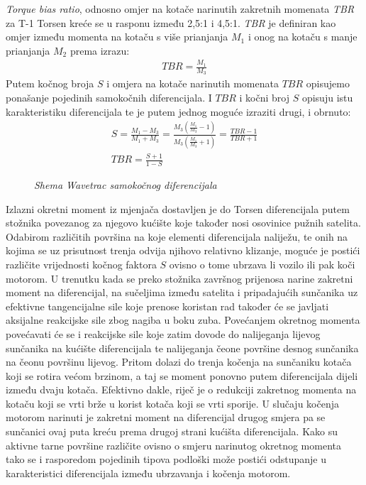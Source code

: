 \documentclass[11pt]{article}
\numberwithin{equation}{section}%
\begin{document}
\textit{Torque bias ratio}, odnosno omjer na kotače narinutih zakretnih momenata \textit{TBR} za T-1 Torsen kreće se u rasponu između 2,5:1 i 4,5:1. \textit{TBR} je definiran kao omjer između momenta na kotaču s više prianjanja $M_1$ i onog na kotaču s manje prianjanja $M_2$ prema izrazu:
\begin{gather}
TBR=\frac{M_1}{M_3}
\end{gather}
Putem kočnog broja $S$ i omjera na kotače narinutih momenata $TBR$ opisujemo ponašanje pojedinih samokočnih diferencijala. I $TBR$ i kočni broj $S$ opisuju istu karakteristiku diferencijala te je putem jednog moguće izraziti drugi, i obrnuto:
%
\begin{gather}
S=\frac{M_1-M_3}{M_1+M_3}=\frac{M_3\left(\frac{M_1}{M_3}-1\right)}{M_3\left(\frac{M_1}{M_3}+1\right)}=\frac{TBR-1}{TBR+1}\\
TBR=\frac{S+1}{1-S}
\end{gather}
%
\begin{wrapfigure}{r}{0.4\textwidth}
 \centering
 \def\svgwidth{5cm}
 
 \caption{\textit{Shema Wavetrac samokočnog diferencijala} \cite{RRT}}
 \label{fig:wave}
\end{wrapfigure} 
%
Izlazni okretni moment iz mjenjača dostavljen je do Torsen diferencijala putem stožnika povezanog za njegovo kućište koje također nosi osovinice pužnih satelita. Odabirom različitih površina na koje elementi diferencijala naliježu, te onih na kojima se uz prisutnost trenja odvija njihovo relativno klizanje, moguće je postići različite vrijednosti kočnog faktora $S$ ovisno o tome ubrzava li vozilo ili pak koči motorom. U trenutku kada se preko stožnika završnog prijenosa narine zakretni moment na diferencijal, na sučeljima između satelita i pripadajućih sunčanika uz efektivne tangencijalne sile koje prenose koristan rad također će se javljati aksijalne reakcijske sile zbog nagiba u boku zuba. Povećanjem okretnog momenta povećavati će se i reakcijske sile koje zatim dovode do nalijeganja lijevog sunčanika na kućište diferencijala te nalijeganja čeone površine desnog sunčanika na čeonu površinu lijevog. Pritom dolazi do trenja kočenja na sunčaniku kotača koji se rotira većom brzinom, a taj se moment ponovno putem diferencijala dijeli između dvaju kotača. Efektivno dakle, riječ je o redukciji zakretnog momenta na kotaču koji se vrti brže u korist kotača koji se vrti sporije. U slučaju kočenja motorom narinuti je zakretni moment na diferencijal drugog smjera pa se sunčanici ovaj puta kreću prema drugoj strani kućišta diferencijala. Kako su aktivne tarne površine različite ovisno o smjeru narinutog okretnog momenta tako se i rasporedom pojedinih tipova podloški može postići odstupanje u karakteristici diferencijala između ubrzavanja i kočenja motorom.
\end{document}
